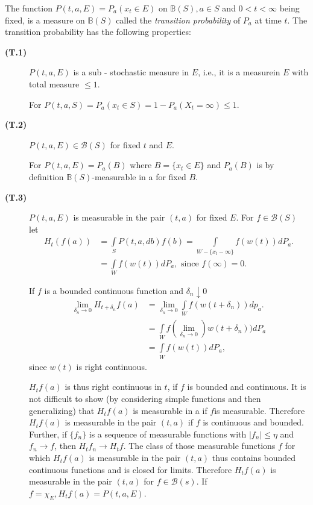 The function $P(t, a, E) = P_a (x_t \in E)$ on $\mathbb{B}(S), a \in
S$ and $0 < t < \infty$ being fixed, is a measure on $\mathbb{B}(S)$
called the \textit{transition probability} of $P_a$ at time
$t$. The transition probability has the following properties:  
\begin{description}
\item[{\bf (T.1)}]
 $P(t, a, E)$ is a sub - stochastic measure in $E$, i.e., it is
  a measure\pageoriginale in $E$ with total measure $\leq 1$.  
  
  For $P(t, a, S) = P_a (x_t \in S) = 1 - P_a (X_t = \infty) \leq 1$.  

\item[{\bf (T.2)}] $P(t, a , E) \in \mathscr{B}(S)$ for fixed $t$ and $E$. 
  
  For $P(t, a, E) = P_a (B)$ where $B = \{ x_t \in E\}$ and $P_a (B)$
  is by definition $\mathbb{B}(S)$-measurable in a for fixed $B$. 

\item[{\bf (T.3)}] $P(t, a, E)$ is measurable in the pair $(t, a)$ for fixed
  $E$. For $f \in \mathscr{B}(S)$ let  
  \begin{align*}
    H_t (f (a)) & =\int\limits_S P(t,a , db )f (b) = \int\limits_{ W -
      \{x_t - \infty\}} f (w (t))dP_a. \\ 
    &= \int\limits_W f (w(t)) dP_a , \text{ since } f (\infty) = 0. 
  \end{align*}


If $f$ is a bounded continuous function and $\delta _n \downarrow 0$
\begin{align*}
 \lim_{\delta _n \to 0} H_{t + \delta_n} f(a) & = \lim _{ \delta _n
   \to 0} \int\limits_ W  f (w(t + \delta _n) ) dp_a. \\ 
 & = \int\limits_W f (\lim _{ \delta _n \to 0}) w (t + \delta _n)) d P_a\\
 &= \int\limits_W f (w(t))dP_a,  
\end{align*}
since $w(t)$ is right continuous. 

$H_t f(a)$ is thus right continuous in $t$, if $f$ is bounded and
continuous. It is not difficult to show (by considering simple
functions and then generalizing) that $H_tf(a)$ is measurable in a if
$f$\pageoriginale is measurable. Therefore $H_t f(a)$ is measurable in
the pair $(t,a)$ if $f$ is continuous and bounded. Further, if $\{ f_n\}$ is a
sequence of  measurable functions with $|f_n | \le \eta$ and $f_n \to
f$, then $H_t f_n \to H_t f$. The class of those measurable functions
$f$ for which $H_t f(a)$ is measurable in the pair $(t,a)$ thus
contains bounded continuous functions and is closed for
limits. Therefore $H_t f(a)$ is measurable in the pair $(t, a)$ for $f
\in  \mathscr{B}(s)$. If $f = \chi_E, H_t f(a)= P(t, a, E)$. 


\end{description}
